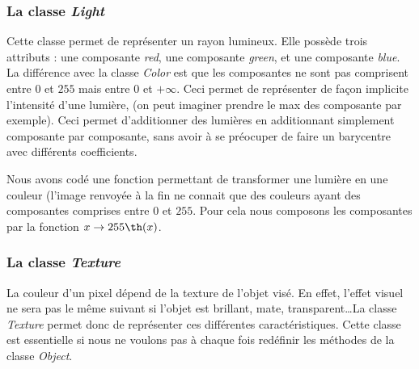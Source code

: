 \documentclass{article}
\begin{document}
\subsubsection{La classe \emph{Light}}
Cette classe permet de représenter un rayon lumineux. Elle possède trois attributs : une composante \emph{red}, une composante \emph{green}, et une composante \emph{blue}.
La différence avec la classe \emph{Color} est que les composantes ne sont pas comprisent entre $0$ et $255$ mais entre $0$ et $+\infty$.
Ceci permet de représenter de façon implicite l'intensité d'une lumière, (on peut imaginer prendre le max des composante par exemple). Ceci permet d'additionner des lumières en additionnant simplement composante par composante, sans avoir à se préocuper de faire un barycentre avec différents coefficients. 


Nous avons codé une fonction permettant de transformer une lumière en une couleur (l'image renvoyée à la fin ne connait que des couleurs ayant des composantes comprises entre $0$ et $255$. Pour cela nous composons les composantes par la fonction $x \rightarrow 255\th(x)$. 

\subsubsection{La classe \emph{Texture}}
	La couleur d'un pixel dépend de la texture de l'objet visé. En effet, l'effet visuel ne sera pas le même suivant si l'objet est brillant, mate, transparent\dots La classe \emph{Texture} permet donc de représenter ces différentes caractéristiques. Cette classe est essentielle si nous ne voulons pas à chaque fois redéfinir les méthodes de la classe \emph{Object}. 


  

	
\end{document}
